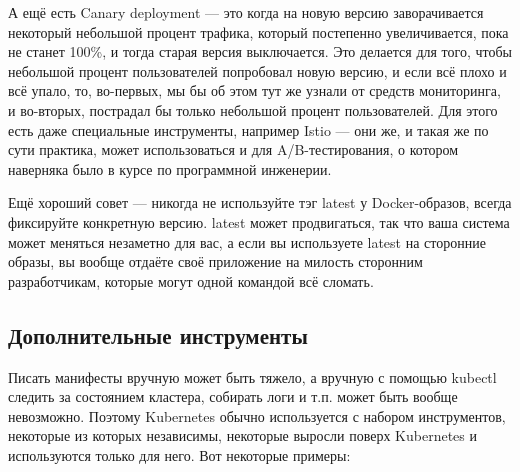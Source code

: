\documentclass[a5paper]{article}
\begin{document}
А ещё есть Canary deployment --- это когда на новую версию заворачивается некоторый небольшой процент трафика, который постепенно увеличивается, пока не станет 100\%, и тогда старая версия выключается. Это делается для того, чтобы небольшой процент пользователей попробовал новую версию, и если всё плохо и всё упало, то, во-первых, мы бы об этом тут же узнали от средств мониторинга, и во-вторых, пострадал бы только небольшой процент пользователей. Для этого есть даже специальные инструменты, например Istio --- они же, и такая же по сути практика, может использоваться и для A/B-тестирования, о котором наверняка было в курсе по программной инженерии.

Ещё хороший совет --- никогда не используйте тэг latest у Docker-образов, всегда фиксируйте конкретную версию. latest может продвигаться, так что ваша система может меняться незаметно для вас, а если вы используете latest на сторонние образы, вы вообще отдаёте своё приложение на милость сторонним разработчикам, которые могут одной командой всё сломать.

\subsection{Дополнительные инструменты}

Писать манифесты вручную может быть тяжело, а вручную с помощью kubectl следить за состоянием кластера, собирать логи и т.п. может быть вообще невозможно. Поэтому Kubernetes обычно используется с набором инструментов, некоторые из которых независимы, некоторые выросли поверх Kubernetes и используются только для него. Вот некоторые примеры:
\end{document}
